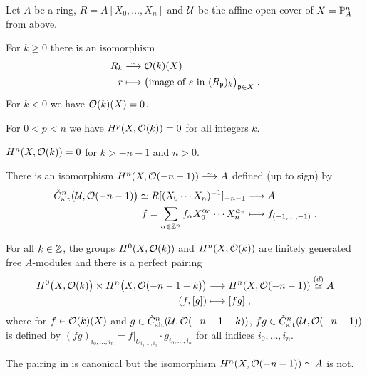 \documentclass[a4paper,parskip=half,numbers=enddot, DIV=12]{scrreprt}
\begin{document}
\begin{thm}
	Let $A$ be a ring, $R=A[X_0,\ldots,X_n]$ and $\mathcal{U}$ be the affine open cover of $X=\mathbb{P}_A^n$ from above. 
	\begin{alphanumerate}
		\item  For $k\geq 0$ there is an isomorphism
		\begin{align}\lbl{eq:Oo(k)(IP^n)}
			\begin{split}
				R_k&\isomorphism \Oo(k)(X)\\
				r&\longmapsto \big(\text{image of }s\text{ in }(R_\pp)_k\big)_{\pp\in X}\;.
			\end{split}
		\end{align}
		For $k<0$ we have $\mathcal{O}(k)(X)=0$.
		\item For $0<p<n$ we have $H^p(X,\mathcal{O}(k))=0$ for all integers $k$.
		\item $H^n(X,\mathcal{O}(k))=0$ for $k>-n-1$ and $n>0$.
		\item There is an isomorphism $H^n(X,\Oo(-n-1))\isomorphism A$ defined (up to sign) by
		\begin{align}\lbl{eq:H^nIP^nO(-n-1)}
			\begin{split}
				\check{C}_\alt^n\big(\Uu,\Oo(-n-1)\big)\simeq R[(X_0\cdots X_n)^{-1}]_{-n-1}&\morphism A\\
				f=\sum_{\alpha\in\IZ^n}f_\alpha X_0^{\alpha_0}\cdots X_n^{\alpha_n}&\longmapsto f_{(-1,\ldots,-1)}\;.
			\end{split}
		\end{align}
		\item For all $k\in\mathbb{Z}$, the groups $H^0(X,\mathcal{O}(k))$ and $H^n(X,\mathcal{O}(k))$ are finitely generated free $A$-modules and there is a perfect pairing
		\begin{align}\lbl{eq:nonDegCohoPairing}
			\begin{split}
				H^0\big(X,\Oo(k)\big)\times H^n\big(X,\Oo(-n-1-k)\big)&\morphism H^n(X,\Oo(-n-1))\overset{\text{\itememph{d}}}{\simeq}A\\
				(f,[g])&\longmapsto [fg]\;,
			\end{split}
		\end{align}
		where for $f\in\mathcal{O}(k)(X)$ and $g\in\check{C}_{\mathrm{alt}}^n(\mathcal{U},\mathcal{O}(-n-1-k))$,  $fg\in\check{C}_{\mathrm{alt}}^n(\mathcal{U},\mathcal{O}(-n-1))$ is defined by $(fg)_{i_0,\ldots,i_n}=f|_{U_{i_0,\ldots,i_n}}\cdot g_{i_0,\ldots,i_n}$ for all indices $i_0,\ldots,i_n$.
	\end{alphanumerate}
\end{thm}
\begin{rem*}
	The pairing in  is canonical but the isomorphism $H^n(X,\mathcal{O}(-n-1))\simeq A$ is not.
\end{rem*}
\end{document}
